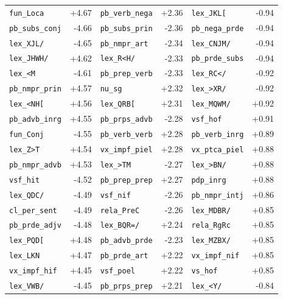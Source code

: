 \begin{longtable}{lrlrlr}
\texttt{fun\_Loca} & +4.67 & \texttt{pb\_verb\_nega} & +2.36 & \texttt{lex\_JKL[} & -0.94 \\
\texttt{pb\_subs\_conj} & -4.66 & \texttt{pb\_subs\_prin} & -2.36 & \texttt{pb\_nega\_prde} & -0.94 \\
\texttt{lex\_XJL/} & -4.65 & \texttt{pb\_nmpr\_art} & -2.34 & \texttt{lex\_CNJM/} & -0.94 \\
\texttt{lex\_JHWH/} & +4.62 & \texttt{lex\_R\textless{}H/} & -2.33 & \texttt{pb\_prde\_subs} & -0.94 \\
\texttt{lex\_\textless{}M} & -4.61 & \texttt{pb\_prep\_verb} & -2.33 & \texttt{lex\_RC\textless{}/} & -0.92 \\
\texttt{pb\_nmpr\_prin} & +4.57 & \texttt{nu\_sg} & +2.32 & \texttt{lex\_\textgreater{}XR/} & -0.92 \\
\texttt{lex\_\textless{}NH[} & +4.56 & \texttt{lex\_QRB[} & +2.31 & \texttt{lex\_MQWM/} & +0.92 \\
\texttt{pb\_advb\_inrg} & +4.55 & \texttt{pb\_prps\_advb} & -2.28 & \texttt{vsf\_hof} & +0.91 \\
\texttt{fun\_Conj} & -4.55 & \texttt{pb\_verb\_verb} & +2.28 & \texttt{pb\_verb\_inrg} & +0.89 \\
\texttt{lex\_Z\textgreater{}T} & +4.54 & \texttt{vx\_impf\_piel} & +2.28 & \texttt{vx\_ptca\_piel} & +0.88 \\
\texttt{pb\_nmpr\_advb} & +4.53 & \texttt{lex\_\textgreater{}TM} & -2.27 & \texttt{lex\_\textgreater{}BN/} & +0.88 \\
\texttt{vsf\_hit} & -4.52 & \texttt{pb\_prep\_prep} & +2.27 & \texttt{pdp\_inrg} & +0.88 \\
\texttt{lex\_QDC/} & -4.49 & \texttt{vsf\_nif} & -2.26 & \texttt{pb\_nmpr\_intj} & +0.86 \\
\texttt{cl\_per\_sent} & -4.49 & \texttt{rela\_PreC} & -2.26 & \texttt{lex\_MDBR/} & +0.85 \\
\texttt{pb\_prde\_adjv} & -4.48 & \texttt{lex\_BQR=/} & +2.24 & \texttt{rela\_RgRc} & +0.85 \\
\texttt{lex\_PQD[} & +4.48 & \texttt{pb\_advb\_prde} & -2.23 & \texttt{lex\_MZBX/} & +0.85 \\
\texttt{lex\_LKN} & +4.47 & \texttt{pb\_prde\_art} & +2.22 & \texttt{vx\_impf\_nif} & +0.85 \\
\texttt{vx\_impf\_hif} & +4.45 & \texttt{vsf\_poel} & +2.22 & \texttt{vs\_hof} & +0.85 \\
\texttt{lex\_VWB/} & -4.45 & \texttt{pb\_prps\_prep} & +2.21 & \texttt{lex\_\textless{}Y/} & -0.84 \\

\end{longtable}
